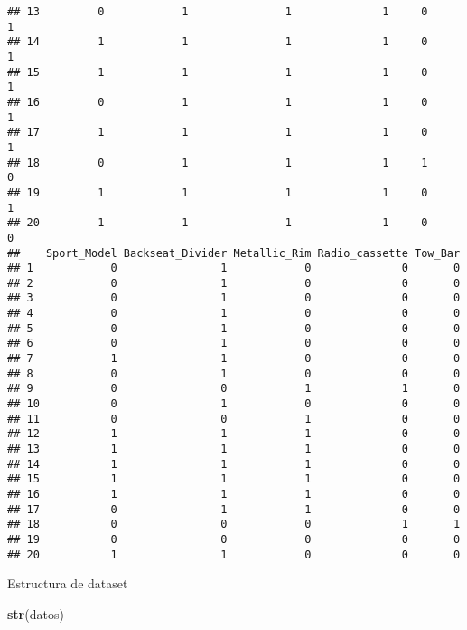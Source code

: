 \documentclass[
]{article}
\newenvironment{Shaded}{\begin{snugshade}}{\end{snugshade}}
\newcommand{\KeywordTok}[1]{\textcolor[rgb]{0.13,0.29,0.53}{\textbf{#1}}}
\newcommand{\NormalTok}[1]{#1}
\begin{document}
\begin{verbatim}
## 13         0            1               1              1     0         1
## 14         1            1               1              1     0         1
## 15         1            1               1              1     0         1
## 16         0            1               1              1     0         1
## 17         1            1               1              1     0         1
## 18         0            1               1              1     1         0
## 19         1            1               1              1     0         1
## 20         1            1               1              1     0         0
##    Sport_Model Backseat_Divider Metallic_Rim Radio_cassette Tow_Bar
## 1            0                1            0              0       0
## 2            0                1            0              0       0
## 3            0                1            0              0       0
## 4            0                1            0              0       0
## 5            0                1            0              0       0
## 6            0                1            0              0       0
## 7            1                1            0              0       0
## 8            0                1            0              0       0
## 9            0                0            1              1       0
## 10           0                1            0              0       0
## 11           0                0            1              0       0
## 12           1                1            1              0       0
## 13           1                1            1              0       0
## 14           1                1            1              0       0
## 15           1                1            1              0       0
## 16           1                1            1              0       0
## 17           0                1            1              0       0
## 18           0                0            0              1       1
## 19           0                0            0              0       0
## 20           1                1            0              0       0
\end{verbatim}

Estructura de dataset

\begin{Shaded}
\begin{Highlighting}[]
\KeywordTok{str}\NormalTok{(datos)}
\end{Highlighting}
\end{Shaded}
\end{document}
